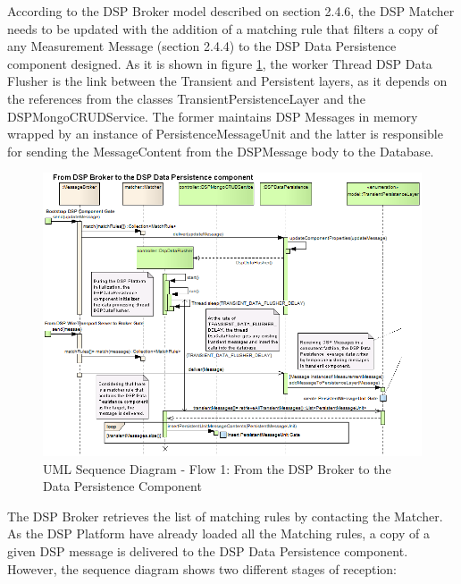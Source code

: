 According to the DSP Broker model described on section 2.4.6, the DSP Matcher
needs to be updated with the addition of a matching rule that filters a copy of
any Measurement Message (section 2.4.4) to the DSP Data Persistence component
designed. As it is shown in figure
\ref{fig:From-DSP-Broker-To-DSPDataPersistence-General-Sequence}, the worker
Thread DSP Data Flusher is the link between the Transient and Persistent
layers, as it depends on the references from the classes
TransientPersistenceLayer and the DSPMongoCRUDService. The former maintains
DSP Messages in memory wrapped by an instance of PersistenceMessageUnit and
the latter is responsible for sending the MessageContent from the DSPMessage
body to the Database.

\begin{figure}[!b]
  \centering
  \includegraphics[scale=0.5]{../diagrams/From-DSP-Broker-To-DSPDataPersistence-General-Sequence}
  \caption{UML Sequence Diagram - Flow 1: From the DSP Broker to the Data
  Persistence Component}
  \label{fig:From-DSP-Broker-To-DSPDataPersistence-General-Sequence}
\end{figure}

The DSP Broker retrieves the list of matching rules by contacting the Matcher.
As the DSP Platform have already loaded all the Matching rules, a copy of a
given DSP message is delivered to the DSP Data Persistence component. However,
the sequence diagram shows two different stages of reception:

